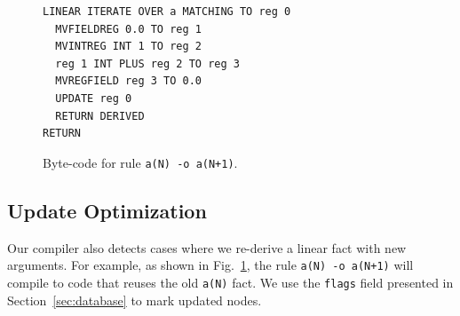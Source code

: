 \begin{figure}
\vspace{-1.5\intextsep}
\scriptsize\begin{Verbatim}
LINEAR ITERATE OVER a MATCHING TO reg 0
  MVFIELDREG 0.0 TO reg 1
  MVINTREG INT 1 TO reg 2
  reg 1 INT PLUS reg 2 TO reg 3
  MVREGFIELD reg 3 TO 0.0
  UPDATE reg 0
  RETURN DERIVED
RETURN
\end{Verbatim}
\caption{\small{Byte-code for rule \texttt{a(N) -o a(N+1)}.}}
\label{code:update}
\vspace{-1.5\intextsep}
\end{figure}

\subsection{Update Optimization}

Our compiler also detects cases where we re-derive a linear fact with new arguments.
For example, as shown in Fig.~\ref{code:update}, the rule \texttt{a(N) -o a(N+1)}
will compile to code that reuses the old \texttt{a(N)} fact.
We use the \texttt{flags} field presented in Section~\ref{sec:database} to mark updated nodes.

